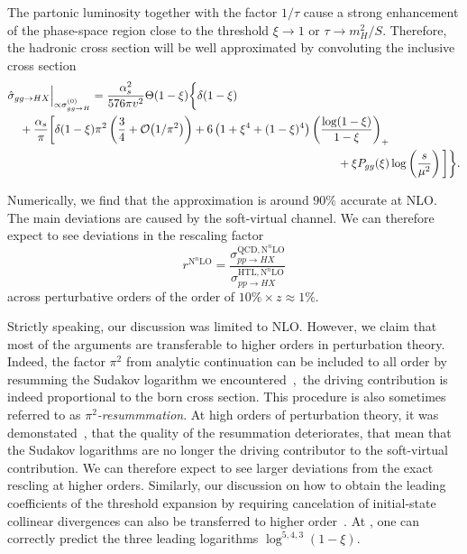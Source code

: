 The partonic luminosity together with the factor $1/\tau$ cause a strong enhancement of the phase-space region close to the threshold $\xi \rightarrow 1$ or $\tau \rightarrow m_H^2/S$. Therefore, the hadronic cross section will be well approximated by convoluting the inclusive cross section
\begin{equation}
\begin{split}
& \hat{\sigma}_{gg \rightarrow HX} \Big \vert_{\propto \sigma_{gg \rightarrow H}^{(0)}} = \frac{\alphas^2}{576 \pi v^2} \Theta(1 - \xi) \bigg \lbrace \delta(1 - \xi) \\
& \quad + \frac{\alphas}{\pi} \bigg [ \delta(1 - \xi) \pi^2\left( \frac{3}{4} + \BigO{1/\pi^2} \right) + 6 \left( 1 + \xi^4 + (1 - \xi)^4 \right) \left(\frac{\log (1 - \xi)}{1 - \xi} \right)_+ \\
& \hspace{10cm} + \xi P_{gg}(\xi) \log \left(\frac{s}{\mu^2} \right) \bigg ] \bigg \rbrace.
\end{split}
\end{equation}

Numerically, we find that the approximation is around $90\%$ accurate at \acs{NLO}. The main deviations are caused by the soft-virtual channel. We can therefore expect to see deviations in the rescaling factor
\begin{equation}
r^{\mathrm{N}^n\mathrm{LO}} = \frac{\sigma_{pp \rightarrow HX}^{\mathrm{QCD}, \mathrm{N}^n \mathrm{LO}}}{\sigma_{pp \rightarrow HX}^{\mathrm{HTL}, \mathrm{N}^n \mathrm{LO}}}
\end{equation}
across perturbative orders of the order of $10\%\times z \approx 1\%$.

Strictly speaking, our discussion was limited to \acs{NLO}. However, we claim that most of the arguments are transferable to higher orders in perturbation theory. Indeed, the factor $\pi^2$ from analytic continuation can be included to all order by resumming the Sudakov logarithm we encountered~\cite{Ahrens:2008qu},\ie\ the driving contribution is indeed proportional to the born cross section. This procedure is also sometimes referred to as $\pi^2$\textit{-resummmation}. At high orders of perturbation theory, it was demonstated~\cite{Anastasiou:2016cez}, that the quality of the resummation deteriorates, that mean that the Sudakov logarithms are no longer the driving contributor to the soft-virtual contribution. We can therefore expect to see larger deviations from the exact rescling at higher orders. Similarly, our discussion on how to obtain the leading coefficients of the threshold expansion by requiring cancelation of initial-state collinear divergences can also be transferred to higher order~\cite{Anastasiou:2014lda}. At \NNNLO, one can correctly predict the three leading logarithms $\log^{5,4,3}( 1 - \xi)$.

